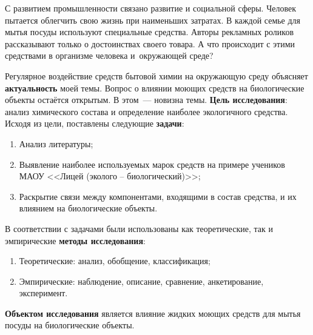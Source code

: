 


\makeProcTitleSchool



С развитием промышленности связано развитие и социальной сферы. Человек пытается облегчить свою жизнь при наименьших затратах. В каждой семье для мытья посуды используют специальные средства. Авторы рекламных роликов рассказывают только о достоинствах своего товара. А что происходит с этими средствами в организме человека и~окружающей среде?

Регулярное воздействие средств бытовой химии на окружающую среду объясняет \textbf{актуальность} моей темы. Вопрос о влиянии моющих средств на биологические объекты остаётся открытым. В этом~--- новизна темы. \textbf{Цель исследования}: анализ химического состава и определение наиболее экологичного средства. Исходя из цели, поставлены следующие \textbf{задачи}:

\begin{enumerate}[noitemsep]\vspace{-8pt}
\item Анализ литературы;
\item Выявление наиболее используемых марок средств на примере учеников МАОУ <<Лицей (эколого – биологический)>>;
\item Раскрытие связи между компонентами, входящими в состав средства, и их влиянием на биологические объекты.
\end{enumerate}\vspace{-8pt}

В соответствии с задачами были использованы как теоретические, так и эмпирические \textbf{методы исследования}:
\begin{enumerate}[noitemsep]\vspace{-8pt}
\item Теоретические: анализ, обобщение, классификация;
\item Эмпирические: наблюдение, описание, сравнение, анкетирование, эксперимент.
\end{enumerate}\vspace{-8pt}

\textbf{Объектом исследования} является влияние жидких моющих средств для мытья посуды на биологические объекты.

